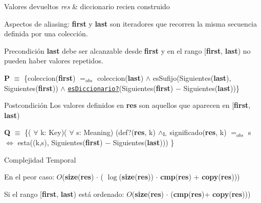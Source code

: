\begin{DoxyRetVals}{Valores devueltos}
{\em res} & diccionario recien construido\\
\hline
\end{DoxyRetVals}
\begin{DoxyParagraph}{Aspectos de aliasing\+:}
{\bfseries first} y {\bfseries last} son iteradores que recorren la misma secuencia definida por una colección.
\end{DoxyParagraph}
\begin{DoxyPrecond}{Precondición}
{\bfseries last} debe ser alcanzable desde {\bfseries first} y en el rango \mbox{[}{\bfseries first}, {\bfseries last}) no pueden haber valores repetidos.

{\bfseries P} $\equiv$ \{coleccion({\bfseries first}) $=_{obs}$ coleccion({\bfseries last}) $\land$ es\+Sufijo(Siguientes({\bfseries last}), Siguientes({\bfseries first})) $\land$ \href{axiomas.html#esDiccionario?}{\tt es\+Diccionario?}(Siguientes({\bfseries first}) $-$ Siguientes({\bfseries last}))\} 
\end{DoxyPrecond}


\begin{DoxyPostcond}{Postcondición}
Los valores definidos en {\bfseries res} son aquellos que aparecen en \mbox{[}{\bfseries first}, {\bfseries last})

{\bfseries Q} $\equiv$ \{( $\forall$ k\+: Key)( $\forall$ s\+: Meaning) (def?({\bfseries res}, k) $\land_{\rm L}$ significado({\bfseries res}, k) $=_{obs}$ s $\Leftrightarrow$ esta((k,s), Siguientes({\bfseries first}) $-$ Siguientes({\bfseries last}))) \} 
\end{DoxyPostcond}



\begin{DoxyDescription}
\item[Complejidad Temporal]
\begin{DoxyItemize}
\item En el peor caso\+: $O$({\bfseries size}({\bfseries res}) $\cdot$ ( $\log$({\bfseries size}({\bfseries res})) $\cdot$ {\bfseries cmp}({\bfseries res}) + {\bfseries copy}({\bfseries res})))
\item Si el rango \mbox{[}{\bfseries first}, {\bfseries last}) está ordenado\+: $O$({\bfseries size}({\bfseries res}) $\cdot$ ({\bfseries cmp}({\bfseries res})+ {\bfseries copy}({\bfseries res}))) 
\end{DoxyItemize}
\end{DoxyDescription}

